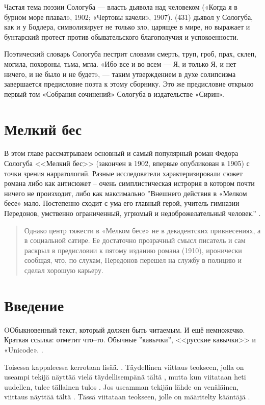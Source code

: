 \documentclass[12pt,a4paper]{article}
\begin{document}
Частая тема поэзии Сологуба — власть дьявола над человеком («Когда я в бурном море плавал», 1902; «Чертовы качели», 1907). (431)
дьявол у Сологуба, как и у Бодлера, символизирует не только зло, царящее в мире, но выражает и бунтарский протест против обывательского благополучия и успокоенности.

 Поэтический словарь Сологуба пестрит словами смерть, труп, гроб, прах, склеп, могила, похороны, тьма, мгла.
 «Ибо все и во всем — Я, и только Я, и нет ничего, и не было и не будет», — таким утверждением в духе солипсизма завершается предисловие поэта к этому сборнику. Это же предисловие открыло первый том «Собрания сочинений» Сологуба в издательстве «Сирин».




\section{Мелкий бес}

В этом главе рассматрываем основный и самый популярный роман Федора Сологуба <<Мелкий бес>> (закончен в 1902, впервые опубликован в 1905) с точки зрения нарратологий. Разные исследователи характеризировали сюжет романа либо как антисюжет -- очень симплистическая истрория в котором почти ничего не произходит, либо как максимально  
''Внешнего действия в «Мелком бесе» мало. Постепенно сходит с ума его главный герой, учитель гимназии Передонов, умственно ограниченный, угрюмый и недоброжелательный человек.''
\parencite[432]{grigorjev1983}.

\begin{quote}
Однако центр тяжести в «Мелком бесе» не в декадентских привнесениях, а в социальной сатире. Ее достаточно прозрачный смысл писатель и сам раскрыл в предисловии к пятому изданию романа (1910), иронически сообщая, что, по слухам, Передонов перешел на службу в полицию и сделал хорошую карьеру.
\parencite[433]{grigorjev1983}
\end{quote}

\section{Введение}

OОбыкновенный текст, который должен быть читаемым. И ещё немножечко. Краткая ссылка: \textcite[150--152]{kobrinski2013} отметит что–то. Обычные ''кавычки'', <<русские кавычки>> и «Unicode». \parencite[200]{kobrinski2013}.

Toisessa kappaleessa kerrotaan lisää. \parencite{shapir2007}. Täydellinen viittaus teokseen,
jolla on useampi tekijä näyttää vielä täydellisempänä
tältä \parencite[][268]{SKS2007}, mutta kun viitataan heti uudellen, tulee tällainen tulos
\parencite[50]{SKS2007}. Jos useamman tekijän lähde on venäläinen, viittaus näyttää tältä
\parencite{ljustrova1976}. Tässä viitataan teokseen, jolle on määritelty kääntäjä
\parencite[25]{ref:sologub1918}.
\end{document}
